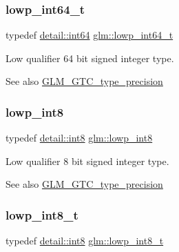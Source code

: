 \subsubsection{\texorpdfstring{lowp\+\_\+int64\+\_\+t}{lowp\_int64\_t}}
{\footnotesize\ttfamily typedef \hyperlink{namespaceglm_1_1detail_a5b1c3227ec636c24a0676746381adfc8}{detail\+::int64} \hyperlink{group__gtc__type__precision_ga14d72e76d57c7f28eca8e933816c9fd6}{glm\+::lowp\+\_\+int64\+\_\+t}}

Low qualifier 64 bit signed integer type. \begin{DoxySeeAlso}{See also}
\hyperlink{group__gtc__type__precision}{G\+L\+M\+\_\+\+G\+T\+C\+\_\+type\+\_\+precision} 
\end{DoxySeeAlso}
\mbox{\label{group__gtc__type__precision_gaf9e675b6392764242ae87eb179e9d3d6}} 
\subsubsection{\texorpdfstring{lowp\+\_\+int8}{lowp\_int8}}
{\footnotesize\ttfamily typedef \hyperlink{namespaceglm_1_1detail_a04b526a8d7a9b455602a0afa78c531e0}{detail\+::int8} \hyperlink{group__gtc__type__precision_gaf9e675b6392764242ae87eb179e9d3d6}{glm\+::lowp\+\_\+int8}}

Low qualifier 8 bit signed integer type. \begin{DoxySeeAlso}{See also}
\hyperlink{group__gtc__type__precision}{G\+L\+M\+\_\+\+G\+T\+C\+\_\+type\+\_\+precision} 
\end{DoxySeeAlso}
\mbox{\label{group__gtc__type__precision_gae6092311f6970a305c2df19a372360a3}} 
\subsubsection{\texorpdfstring{lowp\+\_\+int8\+\_\+t}{lowp\_int8\_t}}
{\footnotesize\ttfamily typedef \hyperlink{namespaceglm_1_1detail_a04b526a8d7a9b455602a0afa78c531e0}{detail\+::int8} \hyperlink{group__gtc__type__precision_gae6092311f6970a305c2df19a372360a3}{glm\+::lowp\+\_\+int8\+\_\+t}}

